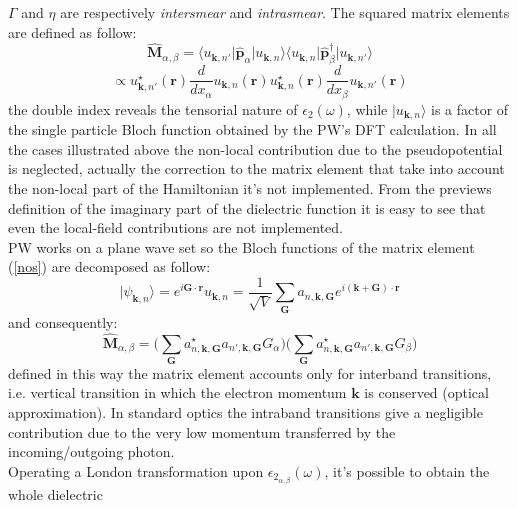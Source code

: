 \documentclass[twocolumn]{article}
\begin{document}
$\Gamma$ and $\eta$ are respectively \emph{intersmear} and \emph{intrasmear}. 
The squared matrix elements are defined as follow:
\begin{equation}
\hat{\textbf{M}}_{\alpha,\beta}=\langle u_{\textbf{k},n'}\vert\hat{\textbf{p}}_{\alpha}\vert u_{\textbf{k},n}\rangle
\langle u_{\textbf{k},n}\vert\hat{\textbf{p}}_{\beta}^{\dagger}\vert u_{\textbf{k},n'}\rangle
\label{nos}
\end{equation}
\begin{equation}
\propto u_{\textbf{k},n'}^{\star}(\textbf{r})\frac{d}{d x_{\alpha}}u_{\textbf{k},n}(\textbf{r})
u_{\textbf{k},n}^{\star}(\textbf{r})\frac{d}{d x_{\beta}}u_{\textbf{k},n'}(\textbf{r})
\end{equation}
the double index reveals the tensorial nature of $\epsilon_{2}(\omega)$, while $\vert u_{\textbf{k},n}\rangle$ is a
factor of the single particle Bloch function obtained by the PW's DFT calculation.
In all the cases illustrated above the non-local contribution due to the pseudopotential is neglected, actually the
correction to the matrix element that take into account the non-local part of the Hamiltonian it's not implemented.
From the previews definition of the imaginary part of the dielectric function it is easy to see that even the local-field
contributions are not implemented.\\
PW works on a plane wave set so the Bloch functions of the matrix element (\ref{nos}) are decomposed as follow:
\begin{equation}
\vert \psi_{\textbf{k},n}\rangle=e^{i\textbf{G}\cdot\textbf{r}}u_{\textbf{k},n}=\frac{1}{\sqrt{V}}\sum_{\textbf{G}}a_{n,\textbf{k},\textbf{G}}
e^{i(\textbf{k}+\textbf{G})\cdot\textbf{r}}
\end{equation}
and consequently:
\begin{equation}
\hat{\textbf{M}}_{\alpha,\beta}=\bigg(\sum_{\textbf{G}}a^{\star}_{n,\textbf{k},\textbf{G}}a_{n',\textbf{k},\textbf{G}}
G_{\alpha}\bigg) \bigg(\sum_{\textbf{G}}a^{\star}_{n,\textbf{k},\textbf{G}}a_{n',\textbf{k},\textbf{G}}
G_{\beta}\bigg)
\end{equation}
defined in this way the matrix element accounts only for interband transitions, i.e. vertical transition in which the
electron momentum $\textbf{k}$ is conserved (optical approximation). In standard optics the intraband transitions give a 
negligible contribution due to the very low momentum transferred by the incoming/outgoing photon.\\
Operating a London transformation upon $\epsilon_{2_{\alpha,\beta}}(\omega)$, it's possible to obtain the whole dielectric
\end{document}
